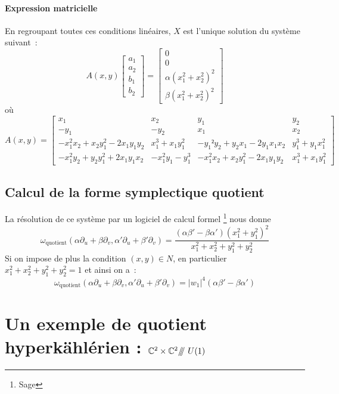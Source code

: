 \documentclass[a4paper,10pt]{article}
\begin{document}
\paragraph{Expression matricielle}
En regroupant toutes ces conditions linéaires, $X$ est l'unique solution du système suivant~:
\[
A(x,y)
\begin{bmatrix}
a_1 \\ 
a_2 \\ 
b_1 \\ 
b_2
\end{bmatrix} 
=
\begin{bmatrix}
0 \\ 
0 \\ 
\alpha(x_1^2+x_2^2)^2 \\ 
\beta(x_1^2+x_2^2)^2
\end{bmatrix} 
\]
où
\[
A(x,y) = 
\begin{bmatrix}
x_1 & x_2 & y_1 & y_2 \\ 
-y_1 & -y_2 & x_1 & x_2 \\ 
-x_1^2x_2 +x_2y_1^2 - 2x_1y_1y_2 & x_1^3+x_1y_1^2 & -y_1²y_2+y_2x_1-2y_1x_1x_2 & y_1^3+y_1x_1^2 \\ 
-x_1^2y_2 +y_2y_1^2 + 2x_1y_1x_2 & -x_1^2y_1 - y_1^3 & -x_1^2x_2 + x_2y_1^2 - 2x_1y_1y_2 & x_1^3 + x_1y_1^2
\end{bmatrix}
\]

\subsection{Calcul de la forme symplectique quotient}
La résolution de ce système par un logiciel de calcul formel \footnote{Sage} nous donne
\[
\omega_\text{quotient}\left(
\alpha \partial_u + \beta \partial_v , 
\alpha' \partial_u + \beta' \partial_v 
\right) = \dfrac{(\alpha \beta' - \beta \alpha')(x^2_1+y^2_1)^2}{x^2_1+x^2_2+y^2_1+y^2_2}
\]
Si on impose de plus la condition $(x,y) \in N$, en particulier $x^2_1+x^2_2+y^2_1+y^2_2 = 1$ et ainsi on a~:
\[
\omega_\text{quotient}\left(
\alpha \partial_u + \beta \partial_v , 
\alpha' \partial_u + \beta' \partial_v 
\right) = |w_1|^4(\alpha \beta' - \beta \alpha')
\]

\pagebreak

\section{Un exemple de quotient hyperkählérien : $\mathbb{C}^2 \times \mathbb{C}^2/\!\!/\!\!/\ U(1)$}
\end{document}

